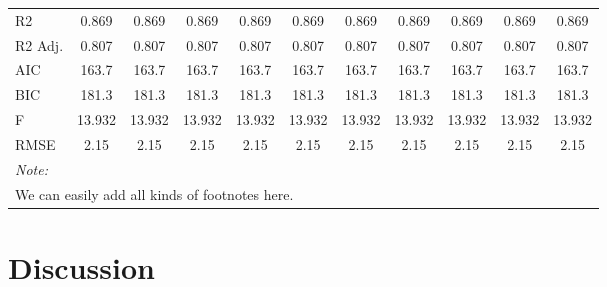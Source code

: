 \documentclass[
  12pt,
]{article}
\begin{document}
{\begin{landscape}
\begin{longtable}[t]{lcccccccccc}
R2 & \num{0.869} & \num{0.869} & \num{0.869} & \num{0.869} & \num{0.869} & \num{0.869} & \num{0.869} & \num{0.869} & \num{0.869} & \num{0.869}\\
R2 Adj. & \num{0.807} & \num{0.807} & \num{0.807} & \num{0.807} & \num{0.807} & \num{0.807} & \num{0.807} & \num{0.807} & \num{0.807} & \num{0.807}\\
AIC & \num{163.7} & \num{163.7} & \num{163.7} & \num{163.7} & \num{163.7} & \num{163.7} & \num{163.7} & \num{163.7} & \num{163.7} & \num{163.7}\\
BIC & \num{181.3} & \num{181.3} & \num{181.3} & \num{181.3} & \num{181.3} & \num{181.3} & \num{181.3} & \num{181.3} & \num{181.3} & \num{181.3}\\
F & \num{13.932} & \num{13.932} & \num{13.932} & \num{13.932} & \num{13.932} & \num{13.932} & \num{13.932} & \num{13.932} & \num{13.932} & \num{13.932}\\
RMSE & \num{2.15} & \num{2.15} & \num{2.15} & \num{2.15} & \num{2.15} & \num{2.15} & \num{2.15} & \num{2.15} & \num{2.15} & \num{2.15}\\*
\multicolumn{11}{l}{\rule{0pt}{1em}\textit{Note: }}\\
\multicolumn{11}{l}{\rule{0pt}{1em}We can easily add all kinds of footnotes here.}\\
\end{longtable}
\end{landscape}
}

\hypertarget{discussion}{%
\section{Discussion}\label{discussion}}
\end{document}
